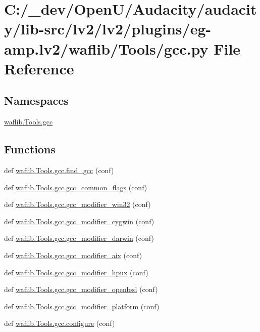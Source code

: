 \hypertarget{lv2_2plugins_2eg-amp_8lv2_2waflib_2_tools_2gcc_8py}{}\section{C\+:/\+\_\+dev/\+Open\+U/\+Audacity/audacity/lib-\/src/lv2/lv2/plugins/eg-\/amp.lv2/waflib/\+Tools/gcc.py File Reference}
\label{lv2_2plugins_2eg-amp_8lv2_2waflib_2_tools_2gcc_8py}
\subsection*{Namespaces}
\begin{DoxyCompactItemize}
\item 
 \hyperlink{namespacewaflib_1_1_tools_1_1gcc}{waflib.\+Tools.\+gcc}
\end{DoxyCompactItemize}
\subsection*{Functions}
\begin{DoxyCompactItemize}
\item 
def \hyperlink{namespacewaflib_1_1_tools_1_1gcc_adf21017012efdee616642ded5bb60683}{waflib.\+Tools.\+gcc.\+find\+\_\+gcc} (conf)
\item 
def \hyperlink{namespacewaflib_1_1_tools_1_1gcc_aa246ce31be40dc13e4667dccc88c659c}{waflib.\+Tools.\+gcc.\+gcc\+\_\+common\+\_\+flags} (conf)
\item 
def \hyperlink{namespacewaflib_1_1_tools_1_1gcc_ae9e66bb9518233bc92bb4dba88559396}{waflib.\+Tools.\+gcc.\+gcc\+\_\+modifier\+\_\+win32} (conf)
\item 
def \hyperlink{namespacewaflib_1_1_tools_1_1gcc_a5a86b1286220845f0499fde5bfd3276d}{waflib.\+Tools.\+gcc.\+gcc\+\_\+modifier\+\_\+cygwin} (conf)
\item 
def \hyperlink{namespacewaflib_1_1_tools_1_1gcc_a1bd8f384e014d4230087830a15403045}{waflib.\+Tools.\+gcc.\+gcc\+\_\+modifier\+\_\+darwin} (conf)
\item 
def \hyperlink{namespacewaflib_1_1_tools_1_1gcc_aaa265ca0c341d3de2b08c63f42ae800b}{waflib.\+Tools.\+gcc.\+gcc\+\_\+modifier\+\_\+aix} (conf)
\item 
def \hyperlink{namespacewaflib_1_1_tools_1_1gcc_aa4d75e5242d8ccd3cf9953b2ac22b0c2}{waflib.\+Tools.\+gcc.\+gcc\+\_\+modifier\+\_\+hpux} (conf)
\item 
def \hyperlink{namespacewaflib_1_1_tools_1_1gcc_a8dadf5c5d5221a13562c2fa8dab9a5cc}{waflib.\+Tools.\+gcc.\+gcc\+\_\+modifier\+\_\+openbsd} (conf)
\item 
def \hyperlink{namespacewaflib_1_1_tools_1_1gcc_a8b495579108d27d3a2ba7efe6fb32489}{waflib.\+Tools.\+gcc.\+gcc\+\_\+modifier\+\_\+platform} (conf)
\item 
def \hyperlink{namespacewaflib_1_1_tools_1_1gcc_abbff880dc3450c1e8e3ecebbd8eebbad}{waflib.\+Tools.\+gcc.\+configure} (conf)
\end{DoxyCompactItemize}
